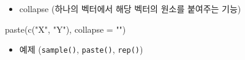 \documentclass[
]{book}
\newenvironment{Shaded}{\begin{snugshade}}{\end{snugshade}}
\newcommand{\AttributeTok}[1]{\textcolor[rgb]{0.77,0.63,0.00}{#1}}
\newcommand{\FunctionTok}[1]{\textcolor[rgb]{0.00,0.00,0.00}{#1}}
\newcommand{\NormalTok}[1]{#1}
\newcommand{\StringTok}[1]{\textcolor[rgb]{0.31,0.60,0.02}{#1}}
\providecommand{\tightlist}{%
  \setlength{\itemsep}{0pt}\setlength{\parskip}{0pt}}
\begin{document}
\begin{itemize}
\tightlist
\item
  collapse (하나의 벡터에서 해당 벡터의 원소를 붙여주는 기능)
\end{itemize}

\begin{Shaded}
\begin{Highlighting}[]
\FunctionTok{paste}\NormalTok{(}\FunctionTok{c}\NormalTok{(}\StringTok{"X"}\NormalTok{, }\StringTok{"Y"}\NormalTok{), }\AttributeTok{collapse =} \StringTok{""}\NormalTok{)}
\end{Highlighting}
\end{Shaded}

\begin{itemize}
\tightlist
\item
  예제 (\texttt{sample()}, \texttt{paste()}, \texttt{rep()})
\end{itemize}
\end{document}
